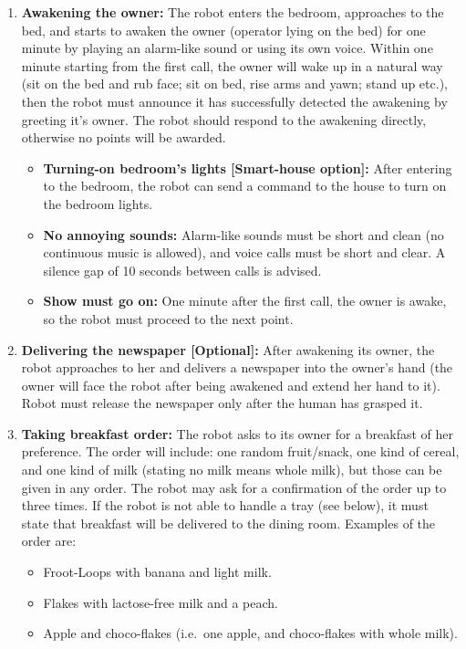 \begin{enumerate}

	\item \textbf{Awakening the owner:} The robot enters the bedroom, approaches to the bed, and starts to awaken the owner (operator lying on the bed) for one minute by playing an alarm-like sound or using its own voice. 
	Within one minute starting from the first call, the owner will wake up in a natural way (sit on the bed and rub face; sit on bed, rise arms and yawn; stand up etc.), 
	  then the robot must announce it has successfully detected the awakening by greeting it's owner.
	The robot should respond to the awakening directly, otherwise no points will be awarded.  
	\begin{itemize}
		\item \textbf{Turning-on bedroom's lights [Smart-house option]:} After entering to the bedroom, the robot can send a command to the house to turn on the bedroom lights.
		\item \textbf{No annoying sounds:} Alarm-like sounds must be short and clean (no continuous music is allowed), and voice calls must be short and clear. A silence gap of 10 seconds between calls is advised.
		\item \textbf{Show must go on:} One minute after the first call, the owner is awake, so the robot must proceed to the next point.
	\end{itemize}

	\item \textbf{Delivering the newspaper [Optional]:} After awakening its owner, the robot approaches to her and delivers a newspaper into the owner's hand (the owner will face the robot after being awakened and extend her hand to it). Robot must release the newspaper only after the human has grasped it.

	\item \textbf{Taking breakfast order:} The robot asks to its owner for a breakfast of her preference. The order will include: one random fruit/snack, one kind of cereal, and one kind of milk (stating no milk means whole milk), but those can be given in any order. The robot may ask for a confirmation of the order up to three times. If the robot is not able to handle a tray (see below), it must state that breakfast will be delivered to the dining room. Examples of the order are:

	\begin{itemize}
	\item Froot-Loops with banana and light milk.
	\item Flakes with lactose-free milk and a peach.
	\item Apple and choco-flakes (i.e.~one apple, and choco-flakes with whole milk).
	\end{itemize}


\end{enumerate}
